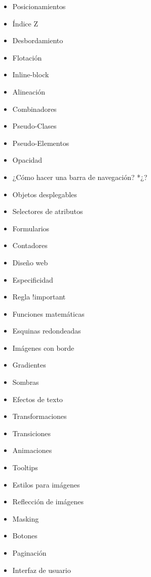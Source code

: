 \documentclass[12pt, letterpaper]{article}
\begin{document}
\begin{enumerate}
\begin{itemize}
\begin{enumerate}
\begin{itemize}
                \item Posicionamientos
                \item Índice Z
                \item Desbordamiento
                \item Flotación
                \item Inline-block
                \item Alineación
                \item Combinadores
                \item Pseudo-Clases
                \item Pseudo-Elementos
                \item Opacidad
                \item ¿Cómo hacer una barra de navegación? *¿?
                \item Objetos desplegables
                \item Selectores de atributos
                \item Formularios
                \item Contadores
                \item Diseño web
                \item Especificidad
                \item Regla !important
                \item Funciones matemáticas
                \item Esquinas redondeadas
                \item Imágenes con borde
                \item Gradientes
                \item Sombras
                \item Efectos de texto
                \item Transformaciones
                \item Transiciones
                \item Animaciones
                \item Tooltips
                \item Estilos para imágenes
                \item Reflección de imágenes
                \item Masking
                \item Botones
                \item Paginación
                \item Interfaz de usuario

\end{itemize}
\end{enumerate}
\end{itemize}
\end{enumerate}
\end{document}
